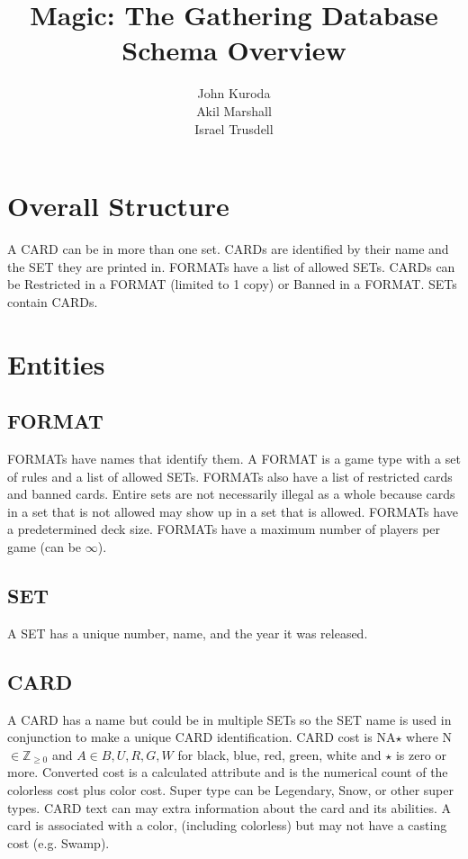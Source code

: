 \documentclass{article}
\title{Magic: The Gathering Database Schema Overview}
\author{John Kuroda\\Akil Marshall\\Israel Trusdell}
\begin{document}
\maketitle
\tableofcontents
\newpage
\section{Overall Structure}
A CARD can be in more than one set.
CARDs are identified by their name and the SET they are printed in.
FORMATs have a list of allowed SETs.
CARDs can be Restricted in a FORMAT (limited to 1 copy) or Banned in a FORMAT.
SETs contain CARDs.

\section{Entities}
\subsection{FORMAT}
FORMATs have names that identify them.
A FORMAT is a game type with a set of rules and a list of allowed SETs.
FORMATs also have a list of restricted cards and banned cards.  Entire sets are not necessarily illegal as a whole because cards in a set that is not allowed may show up in a set that is allowed.
FORMATs have a predetermined deck size.
FORMATs have a maximum number of players per game (can be $\infty$).
\subsection{SET}
A SET has a unique number, name, and the year it was released.
\subsection{CARD}
A CARD has a name but could be in multiple SETs so the SET name is used in conjunction to make a unique CARD identification.
CARD cost is NA$\star$ where N $\in \mathbb{Z}_{\geq 0}$ and $A \in {B, U, R, G, W}$ for black, blue, red, green, white and $\star$ is zero or more.
Converted cost is a calculated attribute and is the numerical count of the colorless cost plus color cost.
Super type can be Legendary, Snow, or other super types.
CARD text can may extra information about the card and its abilities.
A card is associated with a color, (including colorless) but may not have a casting cost (e.g. Swamp).
\end{document}
